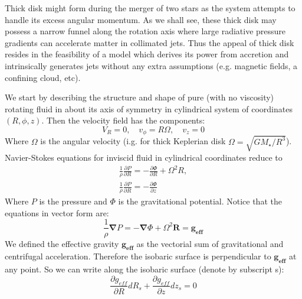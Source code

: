 \documentclass[a4paper,12pt,modern]{aastex62}
\renewcommand{\vec}[1]{\mathbf{#1}}
\begin{document}
Thick disk might form during the merger of two stars as the system attempts to handle its excess angular momentum.
As we shall see, these thick disk may possess a narrow funnel along the rotation axis where large radiative pressure gradients can accelerate matter in collimated jets. 
Thus the appeal of thick disk resides in the feasibility of a model which derives its power from accretion and intrinsically generates jets without any extra assumptions (e.g. magnetic fields, a confining cloud, etc).

We start by describing the structure and shape of pure (with no viscosity) rotating fluid in about its axis of symmetry in cylindrical system of coordinates $(R,\phi,z)$. 
Then the velocity field has the components: 
\begin{equation}\label{eq:velocity_field_components}
V_R=0, \quad v_\phi=R\Omega, \quad v_z=0
\end{equation}
Where $\Omega$ is the angular velocity (i.g. for thick Keplerian disk $\Omega=\sqrt{G M_\star / R^3}$).
Navier-Stokes equations for inviscid fluid in cylindrical coordinates reduce to
\begin{equation}
\begin{split}
\label{eq:inviscid_fluid}
\frac{1}{\rho} \frac{\partial P}{\partial R} = - \frac{\partial \Phi}{\partial R} + \Omega^2R,  \\
\frac{1}{\rho} \frac{\partial P}{\partial R} = - \frac{\partial \Phi}{\partial z}
\end{split}
\end{equation}
Where $P$ is the pressure and $\Phi$ is the gravitational potential.
Notice that the equations in vector form are:
\begin{equation}\label{eq:vector_inviscid_fluid}
\frac{1}{\rho}\mathbf{\nabla} P = -\mathbf{\nabla}\Phi+\Omega^2\mathbf{R} = \vec{g_{eff}}
\end{equation}
We defined the effective gravity $\vec{g_{eff}}$ as the vectorial sum of gravitational and centrifugal acceleration. Therefore the isobaric surface is perpendicular to $\vec{g_{eff}}$ at any point.
So we can write along the isobaric surface (denote by subscript s):
\begin{equation}
\frac{\partial g_{eff}}{\partial R} dR_s + \frac{\partial g_{eff}}{\partial z} dz_s =0
\end{equation}
\end{document}
